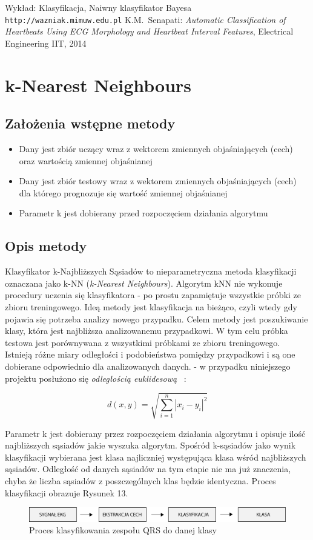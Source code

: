 \documentclass[[10pt,a4paper]{article}
\begin{document}
\begin{thebibliography}{99}
 Wykład: Klasyfikacja, Naiwny klasyfikator Bayesa
\\\texttt{http://wazniak.mimuw.edu.pl}
 K.M.~Senapati:
\emph{Automatic Classification of Heartbeats Using ECG Morphology and Heartbeat Interval Features}, Electrical Engineering IIT, 2014
\end{thebibliography}

\newpage
\section{k-Nearest Neighbours}
\subsection{Założenia wstępne metody} 
\begin{itemize}
\item Dany jest zbiór uczący wraz z wektorem zmiennych objaśniających (cech) oraz wartością zmiennej objaśnianej
\item Dany jest zbiór testowy wraz z wektorem zmiennych objaśniających (cech) dla którego prognozuje się wartość zmiennej objaśnianej
\item Parametr k jest dobierany przed rozpoczęciem działania algorytmu
\end{itemize}

\subsection{Opis metody}
Klasyfikator k-Najbliższych Sąsiadów to nieparametryczna metoda klasyfikacji oznaczana jako k-NN (\emph{k-Nearest Neighbours}). Algorytm kNN nie wykonuje procedury uczenia się klasyfikatora - po prostu zapamiętuje wszystkie próbki ze zbioru treningowego. Ideą metody jest klasyfikacja na bieżąco, czyli wtedy gdy pojawia się potrzeba analizy nowego przypadku. Celem metody jest poszukiwanie klasy, która jest najbliższa analizowanemu przypadkowi. W tym celu próbka testowa jest porównywana z wszystkimi próbkami ze zbioru treningowego. Istnieją różne miary odległości i podobieństwa pomiędzy przypadkowi i są one dobierane odpowiednio dla analizowanych danych. - w przypadku niniejszego projektu posłużono się \emph{odległością euklidesową}  ~\cite{doktorska}:

\[ d(x,y) = \sqrt{\displaystyle\sum_{i=1}^{n} |x_{i} - y_{i}|^{2}} \]

Parametr k jest dobierany przez rozpoczęciem działania algorytmu i opisuje ilość najbliższych sąsiadów jakie wyszuka algorytm. Spośród k-sąsiadów jako wynik klasyfikacji wybierana jest klasa najliczniej występująca klasa wśród najbliższych sąsiadów. Odległość od danych sąsiadów na tym etapie nie ma już znaczenia, chyba że liczba sąsiadów z poszczególnych klas będzie identyczna. Proces klasyfikacji obrazuje Rysunek 13.
\begin{figure}[h]
\centering
\includegraphics[scale=0.6]{algorytm.png}
\caption{Proces klasyfikowania zespołu QRS do danej klasy}
\end{figure}
\end{document}
